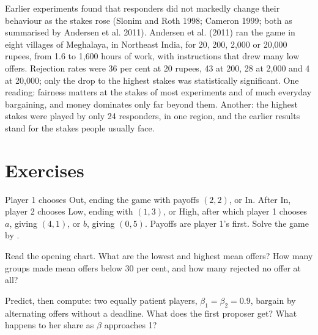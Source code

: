 \begin{debate}
Earlier experiments found that responders did not markedly change their behaviour as the stakes rose
(Slonim and Roth 1998; Cameron 1999; both as summarised by Andersen et al. 2011). Andersen et al. (2011) ran the game in
eight villages of Meghalaya, in Northeast India, for 20, 200, 2{,}000 or 20{,}000 rupees, from 1.6 to 1{,}600 hours of
work, with instructions that drew many low offers. Rejection rates were 36 per cent at 20 rupees, 43 at 200, 28 at
2{,}000 and 4 at 20{,}000; only the drop to the highest stakes was statistically significant. One reading: fairness matters
at the stakes of most experiments and of much everyday bargaining, and money dominates only far beyond them.
Another: the highest stakes were played by only 24 responders, in one region, and the earlier results stand for the
stakes people usually face.
\end{debate}

\section{Exercises}\label{sec:b2:dynamic-games:exercises}

\begin{exercise}[$\star$]\label{exo:b2:dynamic-games:1}
Player 1 chooses Out, ending the game with payoffs $(2, 2)$, or In. After In, player 2 chooses Low, ending with
$(1, 3)$, or High, after which player 1 chooses $a$, giving $(4, 1)$, or $b$, giving $(0, 5)$. Payoffs are player 1's first.
Solve the game by .
\end{exercise}

\begin{exercise}[$\star$]\label{exo:b2:dynamic-games:2}
Read the opening chart. What are the lowest and highest mean offers? How many groups made mean offers below
30 per cent, and how many rejected no offer at all?
\end{exercise}

\begin{exercise}[$\star$]\label{exo:b2:dynamic-games:3}
Predict, then compute: two equally patient players, $\beta_1 = \beta_2 = 0.9$, bargain by alternating offers without a
deadline. What does the first proposer get? What happens to her share as $\beta$ approaches 1?
\end{exercise}


